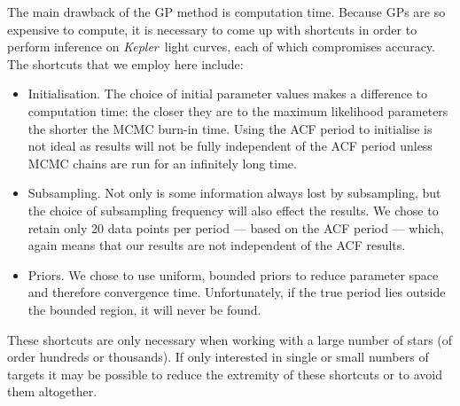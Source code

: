 \documentclass[useAMS, usenatbib, preprint, 12pt]{aastex}
\newcommand{\Kepler}{{\it Kepler}}
\newcommand{\kepler}{\Kepler}
\begin{document}
The main drawback of the GP method is computation time.
Because GPs are so expensive to compute, it is necessary to come up with
shortcuts in order to perform inference on \kepler\ light curves, each of
which compromises accuracy.
The shortcuts that we employ here include:
\begin{itemize}
\item{Initialisation.
The choice of initial parameter values makes a difference to computation time:
the closer they are to the maximum likelihood parameters the shorter the MCMC
burn-in time.
Using the ACF period to initialise is not ideal as results will not be fully
independent of the ACF period unless MCMC chains are run for an infinitely
long time.} \item{Subsampling.
Not only is some information always lost by subsampling, but the choice of
subsampling frequency will also effect the results.
We chose to retain only 20 data points per period --- based on the ACF
period --- which, again means that our results are not independent of the ACF
results.}
\item{Priors.
We chose to use uniform, bounded priors to reduce parameter space and
therefore convergence time.
Unfortunately, if the true period lies outside the bounded region, it will
never be found.}
\end{itemize}

These shortcuts are only necessary when working with a large number of stars
(of order hundreds or thousands).
If only interested in single or small numbers of targets it may be possible to
reduce the extremity of these shortcuts or to avoid them altogether.
\end{document}
